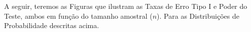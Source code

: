 \documentclass[a4paper,11pt]{article} %
\begin{document}













A seguir, teremos as Figuras que ilustram as Taxas de Erro Tipo I e Poder do Teste, ambos em função do tamanho amostral ($n$). Para as Distribuições de Probabilidade descritas acima.
\end{document}
